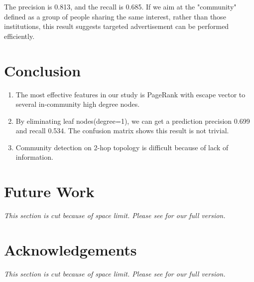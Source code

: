 \documentclass[11pt,a4paper]{article}
\begin{document}
The precision is 0.813, and the recall is 0.685. 
If we aim at the "community" defined as a group 
of people sharing the same interest, rather than 
those institutions, this result suggests targeted 
advertisement can be performed efficiently. 

\section{Conclusion}

\begin{enumerate}
	\item The most effective features in our study is PageRank with escape
	vector to several in-community high degree nodes. 
	\item By eliminating leaf nodes(degree=1), we can get a prediction
	precision 0.699 and recall 0.534. The confusion matrix shows 
	this result is not trivial. 
	\item Community detection on 2-hop topology is difficult 
	because of lack of information. 
\end{enumerate}

\section{Future Work}

\textit{This section is cut because of space limit. Please see \cite{hu2011-cd2hop}
for our full version. }

\section*{Acknowledgements}

\textit{This section is cut because of space limit. Please see \cite{hu2011-cd2hop}
for our full version. }



%
%
%

\end{document}
